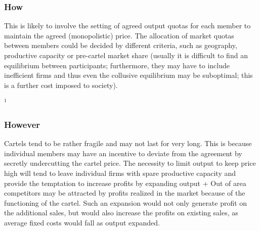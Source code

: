         \subsubsection{How}

            This is likely to involve the setting of agreed output quotas for each member to maintain the agreed (monopolistic) price. The allocation of market quotas between members could be decided by different criteria, such as geography, productive capacity or pre-cartel market share (usually it is difficult to find an equilibrium between participants; furthermore, they may have to include inefficient firms and thus even the collusive equilibrium may be suboptimal; this is a further cost imposed to society).

        \hrulefill
        \newline
        \(^1\) 

        \subsubsection{However}

            Cartels tend to be rather fragile and may not last for very long. This is because individual members may have an incentive to deviate from the agreement by secretly undercutting the cartel price. The necessity to limit output to keep price high will tend to leave individual firms with spare productive capacity and provide the temptation to increase profits by expanding output + Out of area competitors may be attracted by profits realized in the market because of the functioning of the cartel. Such an expansion would not only generate profit on the additional sales, but would also increase the profits on existing sales, as average fixed costs would fall as output expanded.

